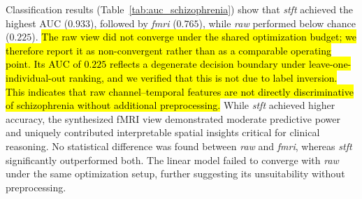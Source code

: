 \documentclass{article}
\begin{document}
Classification results (Table~\ref{tab:auc_schizophrenia}) show that \textit{stft} achieved the highest AUC ($0.933$), followed by \textit{fmri} ($0.765$), while \textit{raw} performed below chance ($0.225$). \hl{The raw view did not converge under the shared optimization budget; we therefore report it as non-convergent rather than as a comparable operating point. Its AUC of {$0.225$} reflects a degenerate decision boundary under leave-one-individual-out ranking, and we verified that this is not due to label inversion. This indicates that raw channel–temporal features are not directly discriminative of schizophrenia without additional preprocessing.} While \textit{stft} achieved higher accuracy, the synthesized fMRI view demonstrated moderate predictive power and uniquely contributed interpretable spatial insights critical for clinical reasoning. No statistical difference was found between \textit{raw} and \textit{fmri}, whereas \textit{stft} significantly outperformed both. The linear model failed to converge with \textit{raw} under the same optimization setup, further suggesting its unsuitability without preprocessing. 
\end{document}
